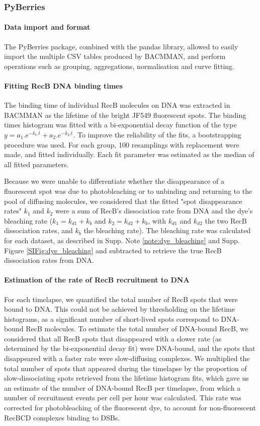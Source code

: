 \subsubsection*{PyBerries}
\paragraph*{Data import and format}
The PyBerries package, combined with the pandas library, allowed to easily import the multiple CSV tables produced by BACMMAN, and perform operations such as grouping, aggregations, normalisation and curve fitting.

\paragraph*{Fitting RecB DNA binding times}
The binding time of individual RecB molecules on DNA was extracted in BACMMAN as the lifetime of the bright JF549 fluorescent spots. The binding times histogram was fitted with a bi-exponential decay function of the type $y=a_1.e^{-k_1.t} + a_2.e^{-k_2.t}$. To improve the reliability of the fits, a bootstrapping procedure was used. For each group, 100 resamplings with replacement were made, and fitted individually. Each fit parameter was estimated as the median of all fitted parameters.

Because we were unable to differentiate whether the disappearance of a fluorescent spot was due to photobleaching or to unbinding and returning to the pool of diffusing molecules, we considered that the fitted "spot disappearance rates" $k_1$ and $k_2$ were a sum of RecB's dissociation rate from DNA and the dye's bleaching rate ($k_1=k_{d1}+k_b$ and $k_2=k_{d2}+k_b$, with $k_{d1}$ and $k_{d2}$ the two RecB dissociation rates, and $k_b$ the bleaching rate). The bleaching rate was calculated for each dataset, as described in Supp. Note \ref{note:dye_bleaching} and Supp. Figure \ref{SIFig:dye_bleaching} and subtracted to retrieve the true RecB dissociation rates from DNA.

\paragraph*{Estimation of the rate of RecB recruitment to DNA}
For each timelapse, we quantified the total number of RecB spots that were bound to DNA. This could not be achieved by thresholding on the lifetime histograms, as a significant number of short-lived spots correspond to DNA-bound RecB molecules. To estimate the total number of DNA-bound RecB, we considered that all RecB spots that disappeared with a slower rate (as determined by the bi-exponential decay fit) were DNA-bound, and the spots that disappeared with a faster rate were slow-diffusing complexes. We multiplied the total number of spots that appeared during the timelapse by the proportion of slow-dissociating spots retrieved from the lifetime histogram fits, which gave us an estimate of the number of DNA-bound RecB per timelapse, from which a number of recruitment events per cell per hour was calculated. This rate was corrected for photobleaching of the fluorescent dye, to account for non-fluorescent RecBCD complexes binding to DSBs.

